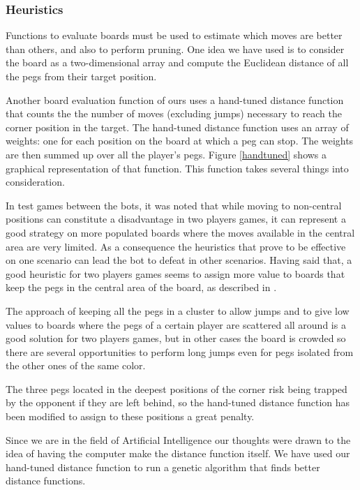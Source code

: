 


\subsubsection{Heuristics}

Functions to evaluate boards must be used to estimate which moves are
better than others, and also to perform pruning. One idea we have used
is to consider the board as a two-dimensional array and compute the
Euclidean distance of all the pegs from their target position.

Another board evaluation function of ours uses a hand-tuned distance
function that counts the the number of moves (excluding jumps)
necessary to reach the corner position in the target. The hand-tuned
distance function uses an array of weights: one for each position on
the board at which a peg can stop. The weights are then summed up over
all the player's pegs. Figure \ref{handtuned} shows a graphical
representation of that function. This function takes several things
into consideration.

In test games between the bots, it was noted that while moving to
non-central positions can constitute a disadvantage in two players games, it can
represent a good strategy on more populated boards where the moves available in
the central area are very limited. As a consequence the heuristics that prove to
be effective on one scenario can lead the bot to defeat in other scenarios.
Having said that, a good heuristic for two players games seems to assign more
value to boards that keep the pegs in the central area of the board, as
described in \cite{ulfhake}.

The approach of keeping all the pegs in a cluster to allow jumps and to give low
values to boards where the pegs of a certain player are scattered all around is
a good solution for two players games, but in other cases the board is crowded
so there are several opportunities to perform long jumps even for pegs isolated
from the other ones of the same color.

The three pegs located in the deepest positions of the corner risk being trapped
by the opponent if they are left behind, so the hand-tuned distance function has
been modified to assign to these positions a great penalty.

Since we are in the field of Artificial Intelligence our thoughts
were drawn to the idea of having the computer make the distance
function itself. We have used our hand-tuned distance function to run
a genetic algorithm that finds better distance functions.


